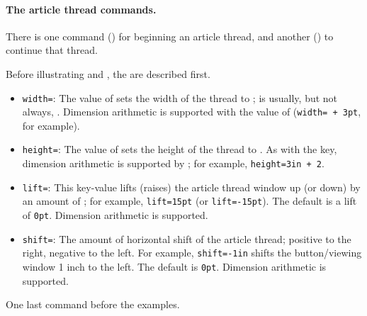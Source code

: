 \documentclass{article}
\begin{document}
\paragraph*{The article thread commands.} There is one command
() for beginning an article thread, and another ()
to continue that thread.
\bVerb{}%
\begin{dCmd}[commandchars=!()]{\bxSize}
\end{dCmd}
\endgroup\noindent Before illustrating  and , the
 are described first.
\begin{itemize}
\item \texttt{width=}: The value of  sets the
    width of the thread to ;  is usually, but
    not always, . Dimension arithmetic is supported with the
    value of  (\texttt{width=\,+\,3pt}, for
    example).

\item \texttt{height=}: The value of  sets the
    height of the thread to . As with the  key,
    dimension arithmetic is supported by ; for
    example, \texttt{height=3in\,+\,2}.

\item \texttt{lift=}: This key-value lifts (raises) the
    article thread window up (or down) by an amount of ; for
    example, \texttt{lift=15pt} (or \texttt{lift=-15pt}). The default is a
    lift of \texttt{0pt}. Dimension arithmetic is supported.

\item \texttt{shift=}: The amount of horizontal shift of the
    article thread; positive to the right, negative to the left. For
    example, \texttt{shift=-1in} shifts the button/viewing window 1 inch to
    the left. The default is \texttt{0pt}. Dimension arithmetic is supported.
\end{itemize}
One last command before the examples.
\end{document}
